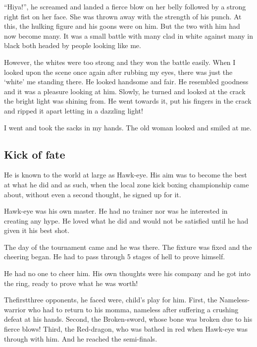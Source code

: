 \documentclass[twoside,11pt]{article}
\begin{document}
“Hiya!”, he screamed and landed a fierce blow on her belly followed by a strong right fist on her face. She was thrown away with the strength of his punch. At this, the hulking figure and his goons were on him. But the two with him had now become many. It was a small battle with many clad in white against many in black both headed by people looking like me.

However, the whites were too strong and they won the battle easily. When I looked upon the scene once again after rubbing my eyes, there was just the ‘white’ me standing there. He looked handsome and fair. He resembled goodness and it was a pleasure looking at him. Slowly, he turned and looked at the crack the bright light was shining from. He went towards it, put his fingers in the crack and ripped it apart letting in a dazzling light!

I went  and took the sacks in my hands. The old woman looked and smiled at me.
\newpage

\begin{center}
  \section{Kick of fate}
\end{center}
\bigskip
\bigskip
\bigskip

He is known to the world at large as Hawk-eye. His aim was to become the best at what he did and as such, when the local zone kick boxing championship came about, without even a second thought, he signed up for it.

Hawk-eye was his own master. He had no trainer nor was he interested in creating any hype. He loved what he did and would not be satisfied until he had given it his best shot.

The day of the tournament came and he was there. The fixture was fixed and the cheering began. He had to pass through 5 stages of hell to prove himself.

He had no one to cheer him. His own thoughts were his company and he got into the ring, ready to prove what he was worth!

Thefirstthree opponents, he faced were, child's play for him. First, the Nameless-warrior who had to return to his momma, nameless after suffering a crushing defeat at his hands. Second, the Broken-sword, whose bone was broken due to his fierce blows! Third, the Red-dragon, who was bathed in red when Hawk-eye was through with him. And he reached the semi-finals.
\end{document}
